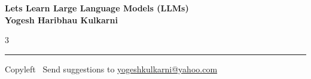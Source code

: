 \documentclass[8pt,landscape]{article}
\begin{document}
\footnotesize


\begin{center}
\Large{\textbf{Lets Learn Large Language Models (LLMs)\\ Yogesh Haribhau Kulkarni}}
\end{center}

\begin{multicols}{3}

\end{multicols}

\rule{\linewidth}{0.25pt}
\scriptsize
Copyleft \textcopyleft\  Send suggestions to
\href{http://www.yogeshkulkarni.com}{yogeshkulkarni@yahoo.com}
\end{document}
